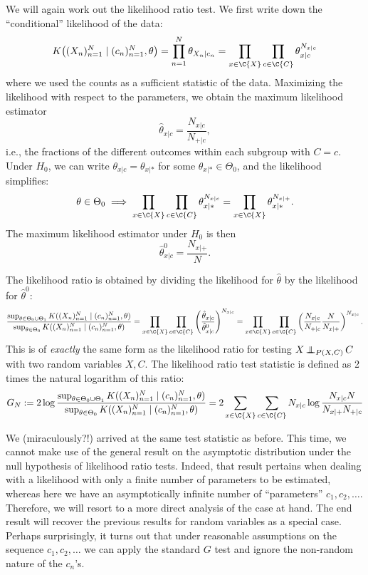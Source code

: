 We will again work out the likelihood ratio test.
We first write down the ``conditional'' likelihood of the data:
$$K\big((X_n)_{n=1}^N \mid (c_n)_{n=1}^N, \theta\big)
= \prod_{n=1}^N \theta_{X_n|c_n} 
= \prod_{x\in\C{X}} \prod_{c\in\C{C}} \theta_{x|c}^{N_{x|c}}$$
where we used the counts as a sufficient statistic of the data.
Maximizing the likelihood with respect to the parameters, we obtain the maximum likelihood estimator
$$\hat \theta_{x|c} = \frac{N_{x|c}}{N_{+|c}},$$
i.e., the fractions of the different outcomes within each subgroup with $C = c$.
Under $H_0$, we can write $\theta_{x|c} = \theta_{x|\ast}$ for some $\theta_{x|\ast} \in \Theta_0$, 
and the likelihood simplifies:
$$\theta \in \Theta_0 \implies \prod_{x\in\C{X}} \prod_{c\in\C{C}} \theta_{x|\ast}^{N_{x|c}} = 
\prod_{x\in\C{X}} \theta_{x|\ast}^{N_{x|+}}.$$
The maximum likelihood estimator under $H_0$ is then
$$\hat \theta^0_{x|c} = \frac{N_{x|+}}{N}.$$

The likelihood ratio is obtained by dividing the likelihood for $\hat \theta$ by the likelihood for $\hat \theta^0$:
\begin{equation}\label{eq:ext_G_test_statistic}
  \frac{\sup_{\theta\in\Theta_0 \cup \Theta_1} K((X_n)_{n=1}^N \mid (c_n)_{n=1}^N, \theta)}{\sup_{\theta\in\Theta_0} K((X_n)_{n=1}^N \mid (c_n)_{n=1}^N, \theta)}
= \prod_{x\in\C{X}} \prod_{c\in\C{C}} \left(\frac{\hat \theta_{x|c}}{\hat \theta^0_{x|c}}\right)^{N_{x|c}} 
= \prod_{x\in\C{X}} \prod_{c\in\C{C}} \left(\frac{N_{x|c}}{N_{+|c}} \frac{N}{N_{x|+}}\right)^{N_{x|c}}.
\end{equation}
This is of \emph{exactly} the same form as the likelihood ratio  for testing
$X \operatorname*{\perp\mkern-11mu\perp}_{P(X,C)} C$ with two random variables $X,C$.
The likelihood ratio test statistic is defined as 2 times the natural logarithm of this ratio:
$$G_N := 2 \log \frac{\sup_{\theta\in\Theta_0 \cup \Theta_1} K((X_n)_{n=1}^N \mid (c_n)_{n=1}^N, \theta)}{\sup_{\theta\in\Theta_0} K((X_n)_{n=1}^N \mid (c_n)_{n=1}^N, \theta)} = 2 \sum_{x\in\C{X}} \sum_{c\in\C{C}} N_{x|c} \log \frac{N_{x|c} N}{N_{x|+} N_{+|c}}$$

We (miraculously?!) arrived at the same test statistic as before.
This time, we cannot make use of the general result on the asymptotic distribution under the null hypothesis of 
likelihood ratio tests. Indeed, that result pertains when dealing
with a likelihood with only a finite number of parameters to be estimated, whereas here we have an asymptotically infinite number
of ``parameters'' $c_1,c_2,\dots$. Therefore, we will resort to a more direct analysis of the case at hand. The end result will
recover the previous results for random variables as a special case. Perhaps surprisingly, it turns out that under reasonable 
assumptions on the sequence $c_1,c_2,\dots$ we can apply the standard $G$ test and ignore the non-random nature of the $c_n$'s.


